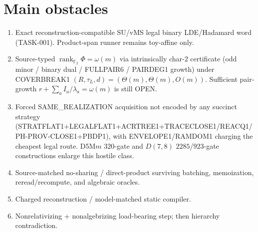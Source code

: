 \documentclass[11pt]{article}
\begin{document}
\section*{Main obstacles}
\begin{enumerate}
\item Exact reconstruction-compatible SU/vMS legal binary LDE/Hadamard word
(TASK-001). Product-span runner remains toy-affine only.
\item Source-typed $\operatorname{rank}_{\mathbb F_2}\Phi=\omega(m)$ via
intrinsically char-$2$ certificate (odd minor / binary dual / FULLPAIR6 /
PAIRDEG1 growth) under COVERBREAK1
$(R,\tau_L,d)=(\Theta(m),\Theta(m),O(m))$. Sufficient pair-growth
$r+\sum_a I_a/\lambda_a=\omega(m)$ is still OPEN.
\item Forced SAME\_REALIZATION acquisition not encoded by any succinct strategy
(STRATFLAT1+LEGALFLAT1+ACRTREE1+TRACECLOSE1/REACQ1/PH-PROV-CLOSE1+PBDP1), with
ENVELOPE1/RAMDOM1 charging the cheapest legal route. D5M$m$ $320$-gate and
$D(7,8)$ $2285$/$923$-gate constructions enlarge this hostile class.
\item Source-matched no-sharing / direct-product surviving batching, memoization,
reread/recompute, and algebraic oracles.
\item Charged reconstruction / model-matched static compiler.
\item Nonrelativizing + nonalgebrizing load-bearing step; then hierarchy
contradiction.
\end{enumerate}
\end{document}
